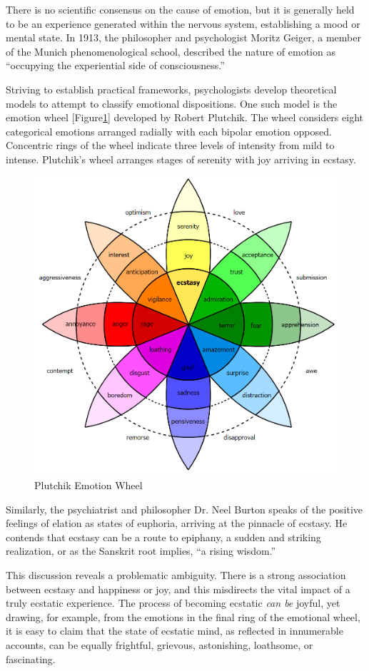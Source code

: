 \documentclass{UIdahoMastersThesis}
\begin{document}
There is no scientific consensus on the cause of emotion, but it is generally held to be an experience generated within the nervous system, establishing a mood or mental state. In 1913, the philosopher and psychologist Moritz Geiger, a member of the Munich phenomenological school, described the nature of emotion as ``occupying the experiential side of consciousness.\cite{mayer-gross_translation:_nodate}''   

Striving to establish practical frameworks, psychologists develop theoretical models to attempt to classify emotional dispositions. One such model is the emotion wheel [Figure\ref{fig:wheel}] developed by Robert Plutchik. The wheel considers eight categorical emotions arranged radially with each bipolar emotion opposed. Concentric rings of the wheel indicate three levels of intensity from mild to intense. Plutchik's wheel arranges stages of serenity with joy arriving in ecstasy.

\begin{figure}[h!]
	\centering
	\includegraphics[width=0.72\linewidth]{plutchik_wheel.png}
	\caption{Plutchik Emotion Wheel}
	\label{fig:wheel}
\end{figure}

Similarly, the psychiatrist and philosopher Dr. Neel Burton speaks of the positive feelings of elation as states of euphoria, arriving at the pinnacle of ecstasy. He contends that ecstasy can be a route to epiphany, a sudden and striking realization, or as the Sanskrit root implies, ``a rising wisdom\cite{burton_heaven_2015}.''

This discussion reveals a problematic ambiguity. There is a strong association between ecstasy and happiness or joy, and this misdirects the vital impact of a truly ecstatic experience. The process of becoming ecstatic \emph{can be} joyful, yet drawing, for example, from the emotions in the final ring of the emotional wheel, it is easy to claim that the state of ecstatic mind, as reflected in innumerable accounts, can be equally frightful, grievous, astonishing, loathsome, or fascinating.
\end{document}
